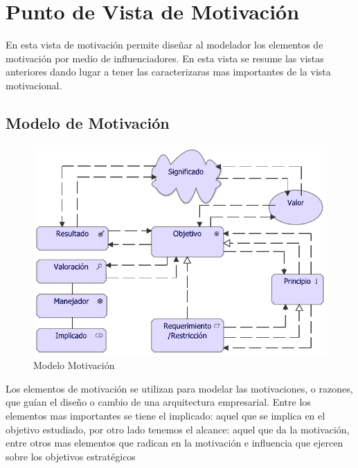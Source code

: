 \section{Punto de Vista de Motivación}
En esta vista de motivación permite diseñar al modelador los elementos de motivación por medio de influenciadores. En esta vista se resume las vistas anteriores dando lugar a tener las caracterizaras mas importantes de la vista motivacional.

\subsection{Modelo de Motivación}
\begin{figure}[h!]
	\centering
	\includegraphics[width=1.0\linewidth]{imgs/modelo/Motivacion}
	\caption{Modelo Motivación}
\end{figure}

Los elementos de motivación se utilizan para modelar las motivaciones, o razones, que guían el diseño o cambio de una arquitectura empresarial. Entre los elementos mas importantes se tiene el implicado: aquel que se implica en el objetivo estudiado, por otro lado tenemos el alcance: aquel que da la motivación, entre otros mas elementos que radican en la motivación e influencia que ejercen sobre los objetivos estratégicos


